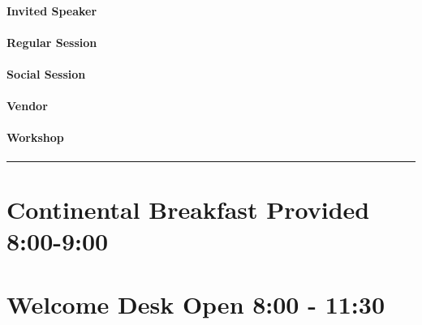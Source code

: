 \documentclass[
]{book}
\begin{document}
\begin{speaker}
\hypertarget{invited-speaker}{%
\paragraph{Invited Speaker}\label{invited-speaker}}
\end{speaker}

\begin{session}
\hypertarget{regular-session}{%
\paragraph{Regular Session}\label{regular-session}}
\end{session}

\begin{social}
\hypertarget{social-session}{%
\paragraph{Social Session}\label{social-session}}
\end{social}

\begin{vendor}
\hypertarget{vendor}{%
\paragraph{Vendor}\label{vendor}}
\end{vendor}

\begin{workshop}
\hypertarget{workshop}{%
\paragraph{Workshop}\label{workshop}}
\end{workshop}

\begin{center}\rule{0.5\linewidth}{0.5pt}\end{center}

\hypertarget{continental-breakfast-provided-800-900}{%
\section*{Continental Breakfast Provided \textbar{} 8:00-9:00}\label{continental-breakfast-provided-800-900}}

\hypertarget{welcome-desk-open-800---1130}{%
\section*{Welcome Desk Open \textbar{} 8:00 - 11:30}\label{welcome-desk-open-800---1130}}
\end{document}
